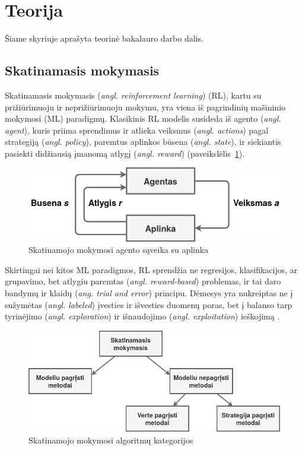 \documentclass{VUMIFPSbakalaurinis}
\begin{document}
\section{Teorija}\label{sec:1}
Šiame skyriuje aprašyta teorinė bakalauro darbo dalis.

\subsection{Skatinamasis mokymasis}\label{subsec:RL} 
{
	Skatinamasis mokymasis (\textit{angl. reinforcement learning}) (RL), kartu su prižiūrimuoju ir neprižiūrimuoju mokymu, yra viena iš pagrindinių mašininio mokymosi (ML) paradigmų. Klasikinis RL modelis susideda iš agento (\textit{angl. agent}), kuris priima sprendimus ir atlieka veiksmus (\textit{angl. actions}) pagal strategiją  (\textit{angl. policy}), paremtus aplinkos būsena (\textit{angl. state}), ir siekiantis pasiekti didžiausią įmanomą atlygį (\textit{angl. reward}) (paveikslėlis~\ref{img:rl}).\par
	
	\begin{figure}[H]
		\centering
		\includegraphics[scale=0.33]{img/rl}
		\caption{Skatinamojo mokymosi agento sąveika su aplinka}
		\label{img:rl}
	\end{figure} 
	
	Skirtingai nei kitos ML paradigmos, RL sprendžia ne regresijos, klasifikacijos, ar grupavimo, bet atlygiu paremtas (\textit{angl. reward-based}) problemas, ir tai daro bandymų ir klaidų (\textit{ang. trial and error}) principu. Dėmesys yra nukreiptas ne į sužymėtas (\textit{angl. labeled}) įvesties ir išvesties duomenų poras, bet į balanso tarp tyrinėjimo (\textit{angl. exploration}) ir išnaudojimo (\textit{angl. exploitation}) ieškojimą \cite{kaelbling_littman_moore}.\par
	
	\begin{figure}[H]
		\centering
		\includegraphics[scale=0.33]{img/rl_overview}
		\caption{Skatinamojo mokymosi algoritmų kategorijos}
		\label{img:rl_overview}
	\end{figure} 
	
}
\end{document}
